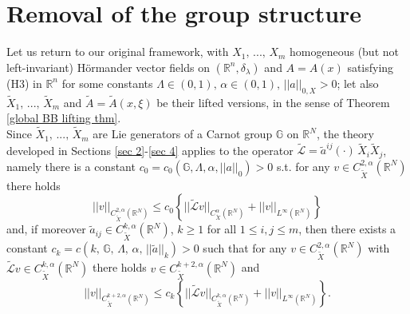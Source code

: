 \documentclass{article}
\numberwithin{equation}{section}
\begin{document}
\section{Removal of the group structure} \label{sec 5}
Let us return to our original framework, with $X_1, \, ..., \, X_m$ homogeneous (but not left-invariant) Hörmander vector fields on $(\mathbb{R}^n, \delta_{\lambda})$ and $A=A(x)$ satisfying (H3) in $\mathbb{R}^n$ for some constants $\Lambda \in (0,1), \, \alpha \in (0,1), \, ||a||_{0,X}>0$; let also $\widetilde{X}_1, \, ..., \, \widetilde{X}_m$ and $\widetilde{A}=\widetilde{A}(x,\xi)$ be their lifted versions, in the sense of Theorem \ref{global BB lifting thm}.\\
Since $\widetilde{X}_1, \, ..., \, \widetilde{X}_m$ are Lie generators of a Carnot group $\mathbb{G}$ on $\mathbb{R}^N$, the theory developed in Sections \ref{sec 2}-\ref{sec 4} applies to the operator $\widetilde{\mathcal{L}}=\widetilde{a}^{ij}(\cdot) \, \widetilde{X}_i \widetilde{X}_j$, namely there is a constant $c_0=c_0(\mathbb{G}, \Lambda, \alpha, ||a||_0)>0$ s.t. for any $v\in C^{2,\alpha}_{\widetilde{X}}(\mathbb{R}^N)$ there holds
\begin{equation}
    \label{lifted Schauder est} ||v||_{C^{2,\alpha}_{\widetilde{X}}(\mathbb{R}^N)} \leq c_0 \left\{ ||\widetilde{\mathcal{L}}v||_{C^{\alpha}_{\widetilde{X}}(\mathbb{R}^N)} + ||v||_{L^{\infty}(\mathbb{R}^N)} \right\}
\end{equation}
and, if moreover $\widetilde{a}_{ij} \in C^{k,\alpha}_{\widetilde{X}}(\mathbb{R}^N)$, $k \geq 1$ for all $1 \leq i,j \leq m$, then there exists a constant $c_k=c(k,\, \mathbb{G}, \, \Lambda, \, \alpha, \, ||\widetilde{a}||_k)>0$ such that for any $v \in C^{2,\alpha}_{\widetilde{X}}(\mathbb{R}^N)$ with $\mathcal{\widetilde{L}}v \in C^{k,\alpha}_{\widetilde{X}}(\mathbb{R}^N)$ there holds $v \in C^{k+2,\alpha}_{\widetilde{X}}(\mathbb{R}^N)$ and
\begin{equation*}
||v||_{C^{k+2,\alpha}_{\widetilde{X}}(\mathbb{R}^N)} \leq c_k \left\{ ||\widetilde{\mathcal{L}}v||_{C^{k,\alpha}_{\widetilde{X}}(\mathbb{R}^N)} + ||v||_{L^{\infty}(\mathbb{R}^N)} \right\}.
\end{equation*}
\\
\end{document}
